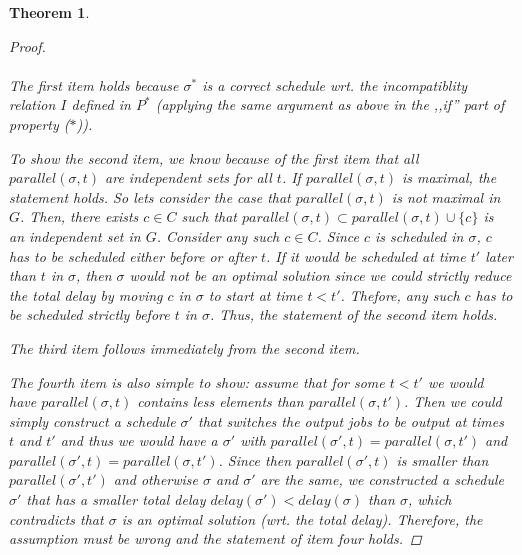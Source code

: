 \documentclass{article}
\newtheorem{mythm}{Theorem}
\begin{document}
\begin{mythm}
\begin{proof}
\begin{enumerate}
\end{enumerate}

\paragraph{}
The first item holds because $\sigma^*$ is a correct schedule wrt. the incompatiblity relation $I$ defined in $P^*$ (applying the same argument as above in the ,,if'' part of property ($\ast$)). 

To show the second item, we know because of the first item that all  ${parallel}(\sigma, t)$ are independent sets for all $t$. If ${parallel}(\sigma, t)$  is maximal, the statement holds. So lets consider the case that ${parallel}(\sigma, t)$ is not maximal in $G$. Then, there exists  $c \in C$ such that ${parallel}(\sigma, t) \subset {parallel}(\sigma, t) \cup \{c\}$ is an independent set in $G$. Consider any such $c \in C$. Since $c$  is scheduled in $\sigma$, $c$ has to be scheduled either before or after $t$. If it would be scheduled at time $t'$ later than $t$ in $\sigma$, then $\sigma$ would not be an optimal solution since we could strictly reduce the total delay by moving $c$ in $\sigma$ to start at time $t < t'$. Thefore, any such $c$ has to be scheduled strictly before $t$ in $\sigma$. Thus, the statement of the second item holds.

The third item follows immediately from the second item. 

The fourth item is also simple to show: assume that for some $t < t'$ we would have ${parallel}(\sigma, t)$ contains less elements than ${parallel}(\sigma, t')$. Then we could simply construct a schedule $\sigma'$ that switches the output jobs to be output at times $t$ and $t'$  and thus we would have a $\sigma'$ with ${parallel}(\sigma', t) = {parallel}(\sigma, t')$ and ${parallel}(\sigma', t) =  {parallel}(\sigma, t')$. Since then ${parallel}(\sigma', t)$ is smaller than ${parallel}(\sigma', t')$ and otherwise $\sigma$ and $\sigma'$ are the same, we constructed a schedule $\sigma'$ that has a smaller total delay ${delay}(\sigma') < {delay}(\sigma) $ than $\sigma$, which contradicts that $\sigma$ is an optimal solution (wrt. the total delay). Therefore, the assumption must be wrong and the statement of item four holds. 


\end{proof}
\end{mythm}
\end{document}
